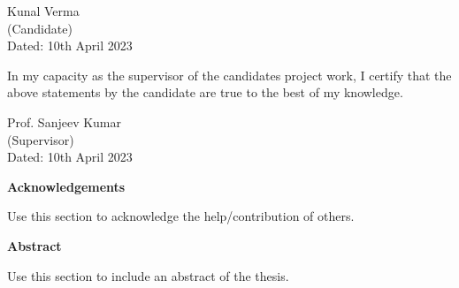 \documentclass[a4paper,12pt]{report}
\numberwithin{equation}{section}
\begin{document}
\begin{flushright}
Kunal Verma
\\
(Candidate)
\\
Dated: 10th April 2023
\end{flushright}

In my capacity as the supervisor of the candidates project work, I certify that the above statements by the candidate are true to the best of my knowledge.

\vspace{2cm}

\begin{flushright}
Prof. Sanjeev Kumar
\\
(Supervisor)
\\
Dated: 10th April 2023
\end{flushright}

\cleardoublepage

\begin{center}
\textbf{\Large Acknowledgements}
\end{center}

Use this section to acknowledge the help/contribution of others.


\newpage
\begin{center}
    \textbf{\Large Abstract}
\end{center}

Use this section to include an abstract of the thesis.

\newpage
\restoregeometry

\listoffigures

\newpage


\tableofcontents
{} 
\newpage


\newpage
\newpage
\newpage



\newpage
\printbibliography
\end{document}
